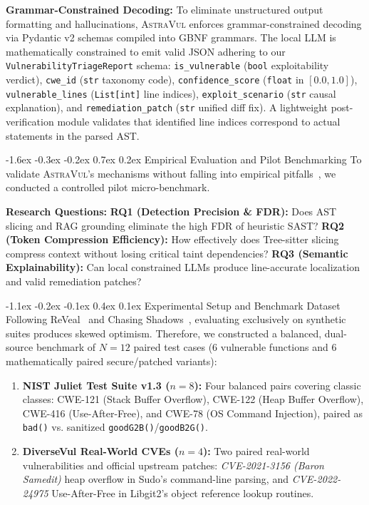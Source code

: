 \documentclass[10pt,twocolumn]{article}
\makeatletter
\renewcommand\section{\@startsection{section}{1}{\z@}%
  {-1.6ex \@plus -0.3ex \@minus -0.2ex}%
  {0.7ex \@plus 0.2ex}%
  {\normalfont\large\bfseries}}
\renewcommand\subsection{\@startsection{subsection}{2}{\z@}%
  {-1.1ex \@plus -0.2ex \@minus -0.1ex}%
  {0.4ex \@plus 0.1ex}%
  {\normalfont\normalsize\bfseries}}
\makeatother
\begin{document}
\vspace{1pt}\noindent\textbf{Grammar-Constrained Decoding:}
To eliminate unstructured output formatting and hallucinations, \textsc{AstraVul} enforces grammar-constrained decoding via Pydantic v2 schemas compiled into GBNF grammars. The local LLM is mathematically constrained to emit valid JSON adhering to our \texttt{VulnerabilityTriageReport} schema: \texttt{is\_vulnerable} (\texttt{bool} exploitability verdict), \texttt{cwe\_id} (\texttt{str} taxonomy code), \texttt{confidence\_score} (\texttt{float} in $[0.0, 1.0]$), \texttt{vulnerable\_lines} (\texttt{List[int]} line indices), \texttt{exploit\_scenario} (\texttt{str} causal explanation), and \texttt{remediation\_patch} (\texttt{str} unified diff fix). A lightweight post-verification module validates that identified line indices correspond to actual statements in the parsed AST.

\section{Empirical Evaluation and Pilot Benchmarking}
To validate \textsc{AstraVul}'s mechanisms without falling into empirical pitfalls~\cite{arp2026chasingshadows}, we conducted a controlled pilot micro-benchmark.

\vspace{1pt}\noindent\textbf{Research Questions:}
\textbf{RQ1 (Detection Precision \& FDR):} Does AST slicing and RAG grounding eliminate the high FDR of heuristic SAST? \textbf{RQ2 (Token Compression Efficiency):} How effectively does Tree-sitter slicing compress context without losing critical taint dependencies? \textbf{RQ3 (Semantic Explainability):} Can local constrained LLMs produce line-accurate localization and valid remediation patches?

\subsection{Experimental Setup and Benchmark Dataset}
Following ReVeal~\cite{chakraborty2021reveal} and Chasing Shadows~\cite{arp2026chasingshadows}, evaluating exclusively on synthetic suites produces skewed optimism. Therefore, we constructed a balanced, dual-source benchmark of $N=12$ paired test cases (6 vulnerable functions and 6 mathematically paired secure/patched variants):
\begin{enumerate}[leftmargin=9pt,topsep=1pt,itemsep=0.5pt]
    \item \textbf{NIST Juliet Test Suite v1.3 ($n=8$):} Four balanced pairs covering classic classes: CWE-121 (Stack Buffer Overflow), CWE-122 (Heap Buffer Overflow), CWE-416 (Use-After-Free), and CWE-78 (OS Command Injection), paired as \texttt{bad()} vs. sanitized \texttt{goodG2B()}/\texttt{goodB2G()}.
    \item \textbf{DiverseVul Real-World CVEs ($n=4$):} Two paired real-world vulnerabilities and official upstream patches: \textit{CVE-2021-3156 (Baron Samedit)} heap overflow in Sudo's command-line parsing, and \textit{CVE-2022-24975} Use-After-Free in Libgit2's object reference lookup routines.
\end{enumerate}
\end{document}
